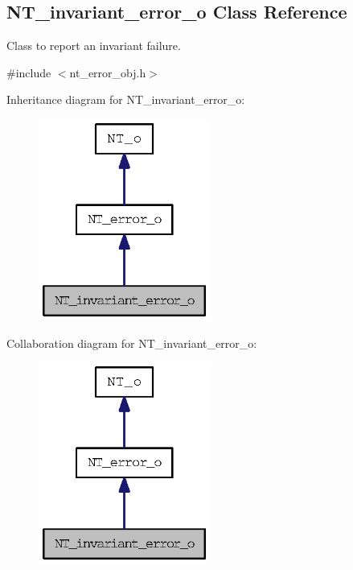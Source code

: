\subsection{NT\_\-invariant\_\-error\_\-o Class Reference}
\label{class_n_t__invariant__error__o}


Class to report an invariant failure.  




{\ttfamily \#include $<$nt\_\-error\_\-obj.h$>$}



Inheritance diagram for NT\_\-invariant\_\-error\_\-o:
\nopagebreak
\begin{figure}[H]
\begin{center}
\leavevmode
\includegraphics[width=160pt]{class_n_t__invariant__error__o__inherit__graph}
\end{center}
\end{figure}


Collaboration diagram for NT\_\-invariant\_\-error\_\-o:
\nopagebreak
\begin{figure}[H]
\begin{center}
\leavevmode
\includegraphics[width=160pt]{class_n_t__invariant__error__o__coll__graph}
\end{center}
\end{figure}
